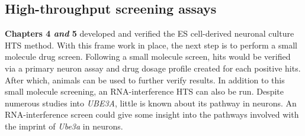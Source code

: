 \subsection{High-throughput screening assays}

\textbf{Chapters 4 \textit{and} 5} developed and verified the ES cell-derived neuronal culture HTS method. With this frame work in place, the next step is to perform a small molecule drug screen. Following a small molecule screen, hits would be verified via a primary neuron assay and drug dosage profile created for each positive hits. After which, animals can be used to further verify results. In addition to this small molecule screening, an RNA-interference HTS can also be run. Despite numerous studies into \textit{UBE3A}, little is known about its pathway in neurons. An RNA-interference screen could give some insight into the pathways involved with the imprint of \textit{Ube3a} in neurons.
